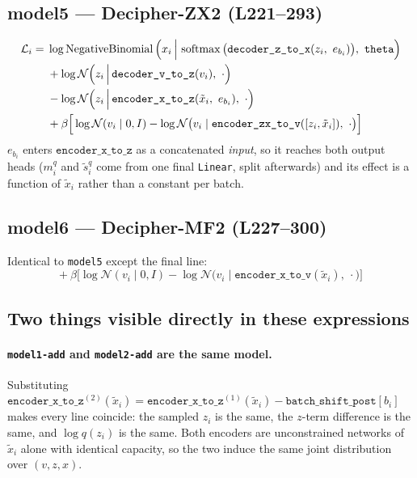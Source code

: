 \documentclass[11pt]{article}
\newcommand{\encxz}{\texttt{encoder\_x\_to\_z}}
\newcommand{\enczxv}{\texttt{encoder\_zx\_to\_v}}
\newcommand{\encxv}{\texttt{encoder\_x\_to\_v}}
\newcommand{\decvz}{\texttt{decoder\_v\_to\_z}}
\newcommand{\deczx}{\texttt{decoder\_z\_to\_x}}
\newcommand{\bpost}{\texttt{batch\_shift\_post}}
\newcommand{\thetapar}{\texttt{theta}}
\newcommand{\smax}{\operatorname{softmax}}
\newcommand{\NB}{\operatorname{NegativeBinomial}}
\newcommand{\Norm}{\mathcal{N}}
\begin{document}
\subsection*{model5 --- Decipher-ZX2 \hfill\normalfont\small(L221--293)}
\begin{align}
\mathcal{L}_i =\;& \log \NB\Big(x_i \,\Big|\, \smax\big(\deczx(z_i,\ e_{b_i})\big),\ \thetapar\Big) \notag\\
&+ \log \Norm\Big(z_i \,\Big|\, \decvz(v_i),\ \cdot\Big) \notag\\
&- \log \Norm\Big(z_i \,\Big|\, \encxz(\tilde{x}_i,\ e_{b_i}),\ \cdot\Big) \notag\\
&+ \beta\Big[\log \Norm(v_i \mid 0, I) - \log \Norm\big(v_i \mid \enczxv([z_i,\tilde{x}_i]),\ \cdot\big)\Big]
\end{align}
$e_{b_i}$ enters $\encxz$ as a concatenated \emph{input}, so it reaches both output heads
($m^{q}_i$ and $\tilde{s}^{q}_i$ come from one final \texttt{Linear}, split afterwards) and its
effect is a function of $\tilde{x}_i$ rather than a constant per batch.

\subsection*{model6 --- Decipher-MF2 \hfill\normalfont\small(L227--300)}
Identical to \texttt{model5} except the final line:
\begin{equation}
+\ \beta\Big[\log \Norm(v_i \mid 0, I) - \log \Norm\big(v_i \mid \encxv(\tilde{x}_i),\ \cdot\big)\Big]
\end{equation}

\subsection*{Two things visible directly in these expressions}

\paragraph{\texttt{model1-add} and \texttt{model2-add} are the same model.}
Substituting
$\encxz^{(2)}(\tilde{x}_i) = \encxz^{(1)}(\tilde{x}_i) - \bpost[b_i]$
makes every line coincide: the sampled $z_i$ is the same, the $z$-term difference is the same,
and $\log q(z_i)$ is the same. Both encoders are unconstrained networks of $\tilde{x}_i$ alone
with identical capacity, so the two induce the same joint distribution over $(v, z, x)$.
\end{document}
